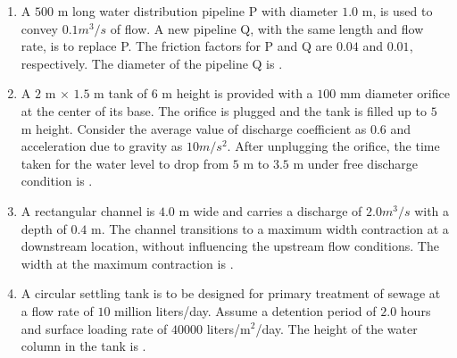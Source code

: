 \documentclass[journal,12pt,onecolumn]{article}
\theoremstyle{remark}
\begin{document}
\begin{enumerate}
    \hfill{}
    
    \item A $500$ m long water distribution pipeline P with diameter $1.0$ m, is used to convey
    $0.1 m^3/s$ of flow. A new pipeline Q, with the same length and flow rate, is to replace
    P. The friction factors for P and Q are $0.04$ and $0.01$, respectively. The diameter of
    the pipeline Q  is \underline{\hspace{2cm}} .
    
    \hfill{}
    
    \item A $2$ m $\times$ $1.5$ m tank of $6$ m height is provided with a $100$ mm diameter orifice at the
    center of its base. The orifice is plugged and the tank is filled up to $5$ m height.
    Consider the average value of discharge coefficient as $0.6$ and acceleration due to
    gravity  as $10 m/s^2$. After unplugging the orifice, the time  taken for
    the water level to drop from $5$ m to $3.5$ m under free discharge condition is
    \underline{\hspace{2cm}} .
    
    \hfill{}
    
    \item A rectangular channel is $4.0$ m wide and carries a discharge of $2.0 m^3/s$ with a depth
    of $0.4$ m. The channel transitions to a maximum width contraction at a downstream
    location, without influencing the upstream flow conditions. The width  at
    the maximum contraction is \underline{\hspace{2cm}} .
    
    \hfill{}
    
    \item A circular settling tank is to be designed for primary treatment of sewage at a flow
    rate of $10$ million liters/day. Assume a detention period of $2.0$ hours and surface
    loading rate of $40000$ liters/m$^2$/day. The height  of the water column in
    the tank is \underline{\hspace{2cm}} .
    
    \hfill{}


\end{enumerate}
\end{document}
